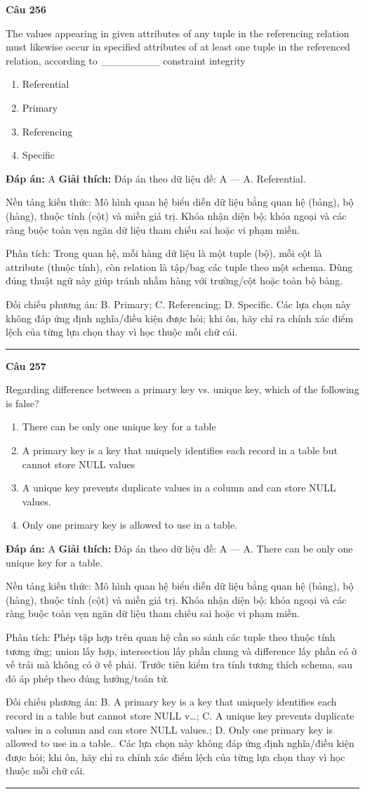 \documentclass[11pt,a4paper]{article}
\newenvironment{question}[1]{%
  \par\vspace{1em}\noindent\textbf{\large Câu #1}\par\vspace{0.4em}
}{%
  \par\vspace{1em}\hrule\vspace{0.6em}
}
\newenvironment{choices}{%
  \begin{enumerate}[label=\textbf{\Alph*.},leftmargin=2.2em,itemsep=2pt,topsep=3pt]
}{%
  \end{enumerate}
}
\newcommand{\choice}{\item}
\begin{document}
\begin{question}{256}
The values appearing in given attributes of any tuple in the referencing relation must likewise occur in specified attributes of at least one tuple in the referenced relation, according to ________ constraint integrity
\begin{choices}
\choice Referential
\choice Primary
\choice Referencing
\choice Specific
\end{choices}
\textbf{Đáp án:} A
\textbf{Giải thích:} Đáp án theo dữ liệu đề: A — A. Referential.

Nền tảng kiến thức: Mô hình quan hệ biểu diễn dữ liệu bằng quan hệ (bảng), bộ (hàng), thuộc tính (cột) và miền giá trị. Khóa nhận diện bộ; khóa ngoại và các ràng buộc toàn vẹn ngăn dữ liệu tham chiếu sai hoặc vi phạm miền.

Phân tích: Trong quan hệ, mỗi hàng dữ liệu là một tuple (bộ), mỗi cột là attribute (thuộc tính), còn relation là tập/bag các tuple theo một schema. Dùng đúng thuật ngữ này giúp tránh nhầm hàng với trường/cột hoặc toàn bộ bảng.

Đối chiếu phương án: B. Primary; C. Referencing; D. Specific. Các lựa chọn này không đáp ứng định nghĩa/điều kiện được hỏi; khi ôn, hãy chỉ ra chính xác điểm lệch của từng lựa chọn thay vì học thuộc mỗi chữ cái.
\end{question}


\begin{question}{257}
Regarding difference between a primary key vs. unique key, which of the following is false?
\begin{choices}
\choice There can be only one unique key for a table
\choice A primary key is a key that uniquely identifies each record in a table but cannot store NULL values
\choice A unique key prevents duplicate values in a column and can store NULL values.
\choice Only one primary key is allowed to use in a table.
\end{choices}
\textbf{Đáp án:} A
\textbf{Giải thích:} Đáp án theo dữ liệu đề: A — A. There can be only one unique key for a table.

Nền tảng kiến thức: Mô hình quan hệ biểu diễn dữ liệu bằng quan hệ (bảng), bộ (hàng), thuộc tính (cột) và miền giá trị. Khóa nhận diện bộ; khóa ngoại và các ràng buộc toàn vẹn ngăn dữ liệu tham chiếu sai hoặc vi phạm miền.

Phân tích: Phép tập hợp trên quan hệ cần so sánh các tuple theo thuộc tính tương ứng; union lấy hợp, intersection lấy phần chung và difference lấy phần có ở vế trái mà không có ở vế phải. Trước tiên kiểm tra tính tương thích schema, sau đó áp phép theo đúng hướng/toán tử.

Đối chiếu phương án: B. A primary key is a key that uniquely identifies each record in a table but cannot store NULL v…; C. A unique key prevents duplicate values in a column and can store NULL values.; D. Only one primary key is allowed to use in a table.. Các lựa chọn này không đáp ứng định nghĩa/điều kiện được hỏi; khi ôn, hãy chỉ ra chính xác điểm lệch của từng lựa chọn thay vì học thuộc mỗi chữ cái.
\end{question}
\end{document}
